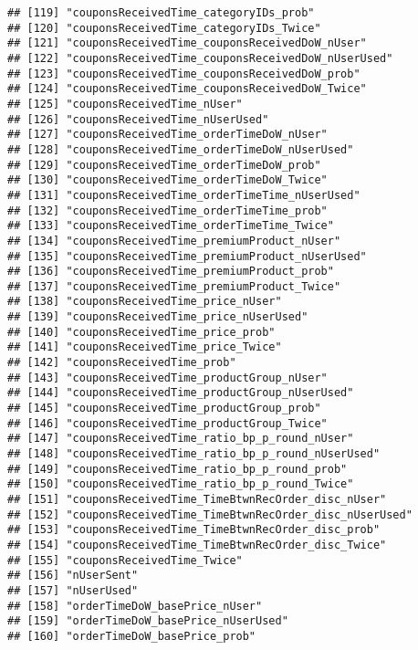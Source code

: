 \documentclass[10pt]{report}
\begin{document}
\begin{verbatim}
## [119] "couponsReceivedTime_categoryIDs_prob"               
## [120] "couponsReceivedTime_categoryIDs_Twice"              
## [121] "couponsReceivedTime_couponsReceivedDoW_nUser"       
## [122] "couponsReceivedTime_couponsReceivedDoW_nUserUsed"   
## [123] "couponsReceivedTime_couponsReceivedDoW_prob"        
## [124] "couponsReceivedTime_couponsReceivedDoW_Twice"       
## [125] "couponsReceivedTime_nUser"                          
## [126] "couponsReceivedTime_nUserUsed"                      
## [127] "couponsReceivedTime_orderTimeDoW_nUser"             
## [128] "couponsReceivedTime_orderTimeDoW_nUserUsed"         
## [129] "couponsReceivedTime_orderTimeDoW_prob"              
## [130] "couponsReceivedTime_orderTimeDoW_Twice"             
## [131] "couponsReceivedTime_orderTimeTime_nUserUsed"        
## [132] "couponsReceivedTime_orderTimeTime_prob"             
## [133] "couponsReceivedTime_orderTimeTime_Twice"            
## [134] "couponsReceivedTime_premiumProduct_nUser"           
## [135] "couponsReceivedTime_premiumProduct_nUserUsed"       
## [136] "couponsReceivedTime_premiumProduct_prob"            
## [137] "couponsReceivedTime_premiumProduct_Twice"           
## [138] "couponsReceivedTime_price_nUser"                    
## [139] "couponsReceivedTime_price_nUserUsed"                
## [140] "couponsReceivedTime_price_prob"                     
## [141] "couponsReceivedTime_price_Twice"                    
## [142] "couponsReceivedTime_prob"                           
## [143] "couponsReceivedTime_productGroup_nUser"             
## [144] "couponsReceivedTime_productGroup_nUserUsed"         
## [145] "couponsReceivedTime_productGroup_prob"              
## [146] "couponsReceivedTime_productGroup_Twice"             
## [147] "couponsReceivedTime_ratio_bp_p_round_nUser"         
## [148] "couponsReceivedTime_ratio_bp_p_round_nUserUsed"     
## [149] "couponsReceivedTime_ratio_bp_p_round_prob"          
## [150] "couponsReceivedTime_ratio_bp_p_round_Twice"         
## [151] "couponsReceivedTime_TimeBtwnRecOrder_disc_nUser"    
## [152] "couponsReceivedTime_TimeBtwnRecOrder_disc_nUserUsed"
## [153] "couponsReceivedTime_TimeBtwnRecOrder_disc_prob"     
## [154] "couponsReceivedTime_TimeBtwnRecOrder_disc_Twice"    
## [155] "couponsReceivedTime_Twice"                          
## [156] "nUserSent"                                          
## [157] "nUserUsed"                                          
## [158] "orderTimeDoW_basePrice_nUser"                       
## [159] "orderTimeDoW_basePrice_nUserUsed"                   
## [160] "orderTimeDoW_basePrice_prob"                        

\end{verbatim}
\end{document}
